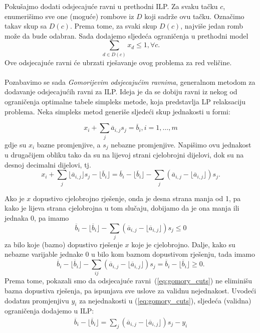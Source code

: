 \documentclass[a4paper, utf8, 11pt, colorlinks]{book}
\begin{document}
Pokušajmo dodati odsjecajuće ravni u prethodni ILP. Za svaku tačku $c$, enumerišimo sve one (moguće) rombove iz $D$ koji sadrže ovu tačku. Označimo takav skup sa $D(c)$. Prema tome, za svaki skup $D(c)$, najviše jedan romb može da bude odabran. Sada dodajemo sljedeća ograničenja u prethodni model
\begin{equation}
     \sum_{d \in D(c)} x_d \leq 1, \forall c.
\end{equation}
Ove odsjecajuće ravni će ubrzati rješavanje ovog problema za   red veličine.\\ \vspace{0.2cm} \\

Pozabavimo se sada \emph{Gomorijevim odsjecajućim ravnima}, generalnom metodom za dodavanje odsjecajućih ravni za  ILP.  Ideja je da se dobiju ravni iz nekog od ograničenja optimalne tabele simpleks metode, koja predstavlja LP relaksaciju problema. Neka simpleks metod generiše sljedeći skup jednakosti u formi:

$$x_i + \sum_{ j} \overline{a}_{i,j} s_j= \overline{b}_i, i=1, \ldots,m$$
gdje su $x_i$ bazne promjenjive, a $s_j$ nebazne promjenjive. Napišimo ovu jednakost u drugačijem obliku tako da su na lijevoj strani cjelobrojni dijelovi, dok su na desnoj decimalni dijelovi, tj.
$$x_i + \sum_{j} \lfloor \overline{a}_{i,j} \rfloor s_j - \lfloor \overline{b}_i \rfloor = \overline{b}_i - \lfloor \overline{b}_i  \rfloor    - \sum_{j} (\overline{a}_{i,j} - \lfloor \overline{a}_{i,j} \rfloor) s_j.$$

Ako je $x$ dopustivo cjelobrojno rješenje, onda je desna strana manja od 1, pa kako je lijeva strana cjelobrojna u tom slučaju, dobijamo da je ona manja ili jednaka 0, pa imamo
\begin{equation}\label{eq:gomory_cuts}
    \overline{b}_i - \lfloor \overline{b}_i  \rfloor    - \sum_{j} (\overline{a}_{i,j} - \lfloor \overline{a}_{i,j} \rfloor) s_j \leq 0
\end{equation}
za bilo koje (bazno) dopustivo rješenje $x$ koje je cjelobrojno. Dalje, kako su nebazne varijable jednake 0 u bilo kom baznom dopustivom rješenju, tada imamo 
$$ \overline{b}_i - \lfloor \overline{b}_i  \rfloor    - \sum_{ij} (\overline{a}_{i,j} - \lfloor \overline{a}_{i,j} \rfloor) s_j = \overline{b}_i - \lfloor \overline{b}_i \rfloor  \geq 0.$$
Prema tome, pokazali smo da odsjecajuće ravni~(\ref{eq:gomory_cuts}) ne eliminišu bazna dopustiva rješenja, pa ispunjava sve uslove za validnu nejednakost. Uvodeći dodatnu promjenjivu $y_i$ za nejednakosti u (\ref{eq:gomory_cuts}), sljedeća (validna) ograničenja dodajemo u ILP:
\begin{align}\label{gomory_cplex}
       \overline{b}_i - \lfloor \overline{b}_i \rfloor=   \sum_{j} (\overline{a}_{i,j} - \lfloor \overline{a}_{i,j} \rfloor)s_j - y_i 
\end{align}
\end{document}

